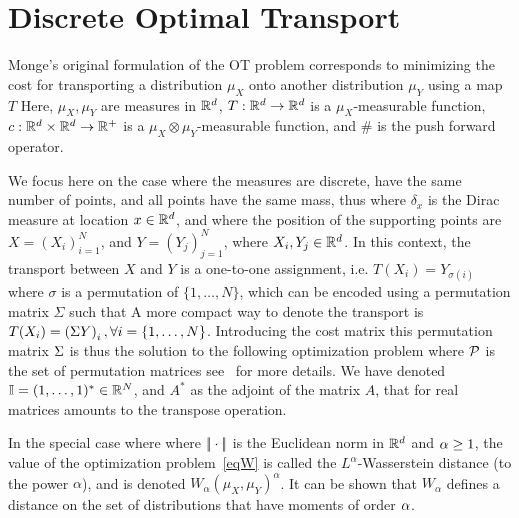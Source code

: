 
\section{Discrete Optimal Transport}

Monge's original formulation of the OT problem corresponds to minimizing the cost for transporting a distribution $\mu_X$ onto another distribution $\mu_Y$ using a map $T$
Here, $\mu_X,\mu_Y$ are measures in $\mathbb{R}^d$, $T: \mathbb{R}^d \rightarrow \mathbb{R}^d$ is a $\mu_X$-measurable function, $c : \mathbb{R}^d \times \mathbb{R}^d \rightarrow \mathbb{R}^+$ is a $\mu_X \otimes \mu_Y$-measurable function, and $\#$ is the push forward operator. 

We focus here on the case where the measures are discrete, have the same number of points, and all points have the same mass, thus 
where $\delta_x$ is the Dirac measure at location $x \in \mathbb{R}^d$, and where the position of the supporting points are $X = (X_i)_{i=1}^N$, and $Y = (Y_j)_{j=1}^N$, where  $X_i,Y_j \in \mathbb{R}^d$. In this context, the transport between $X$ and $Y$ is a one-to-one assignment,  i.e. 
$T(X_i) = Y_{\sigma(i)}$ where $\sigma$ is a permutation of $\{1,\ldots,N\}$, which can be encoded using a permutation matrix $\Sigma$ such that
A more compact way to denote the transport is $T(X_i)=\left(\Sigma Y\right)_i, \forall i=\{1,\ldots,N\}$. Introducing the cost matrix
this permutation matrix $\Sigma$ is thus the solution to the following optimization problem
where $\mathcal{P}$ is the set of permutation matrices  
see~\cite{Villani03} for more details. We have denoted $\mathbb{I}=(1,\ldots,1)^* \in  \mathbb{R}^N$, and $A^*$ as the adjoint of the matrix $A$, that for real matrices amounts to the transpose operation.  
 

In the special case where 
 where $|\!| \cdot |\!|$ is the Euclidean norm in $\mathbb{R}^d$ and $\alpha \ge 1$,  the value of the optimization problem~\eqref{eqW} is called the $L^\alpha$-Wasserstein distance (to the power $\alpha$), and is denoted $W_\alpha(\mu_X,\mu_Y)^\alpha$. It can be shown that $W_\alpha$ defines a distance on the set of distributions that have moments of order $\alpha$.

